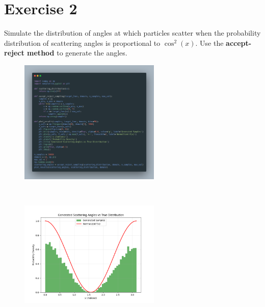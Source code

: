 \documentclass[a4paper,12pt]{article}
\begin{document}
\section{Exercise 2}
Simulate the distribution of angles at which particles scatter when the probability distribution of scattering angles is proportional to $\cos^2(x)$. Use the \textbf{accept-reject method} to generate the angles.
\begin{figure}[h!]
    \centering
    \includegraphics[width=0.6\textwidth]{./Screenshots/2.py.png} 
\end{figure} \\
\begin{figure}[h!]
    \centering
    \includegraphics[width=0.6\textwidth]{./Screenshots/2.png} 
\end{figure} 
\newpage
\end{document}

